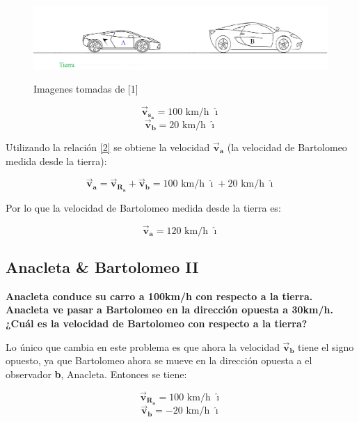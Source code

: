 \documentclass[a4paper,11pt]{article}
\begin{document}
	
	\begin{figure}[h]
		\includegraphics[width=.9\linewidth]{./im/c2}
		\label{fcN4}
		\caption{Imagenes tomadas de [1]}
	\end{figure}
	
	
	$$ \vec{\textbf{v}}_{\textbf{s}_\textbf{a}} = 100 \text{ km/h } \boldsymbol{\hat{\imath}} $$
	$$ \vec{\textbf{v}}_{\textbf{b}} = 20 \text{ km/h } \boldsymbol{\hat{\imath}}$$ 
	
	
	Utilizando la relación \ref{2} se obtiene la velocidad $\vec{\textbf{v}}_{\textbf{a}}$ (la velocidad de Bartolomeo medida desde la tierra):
	
	\begin{equation}
	\vec{\textbf{v}}_{\textbf{a}} = \vec{\textbf{v}}_{\textbf{R}_\textbf{a}} + \vec{\textbf{v}}_{\textbf{b}} = 100 \text{ km/h }\boldsymbol{\hat{\imath}} + 20 \text{ km/h } \boldsymbol{\hat{\imath}}
	\end{equation}
	
	Por lo que la velocidad de Bartolomeo medida desde la tierra es:
	
	\begin{equation}
	\vec{\textbf{v}}_{\textbf{a}}= 120 \text{ km/h } \boldsymbol{\hat{\imath}}
	\end{equation}
		\color{pb}
		\subsection{Anacleta \& Bartolomeo II}
	
	\textbf{Anacleta conduce su carro a 100km/h con respecto a la tierra. Anacleta ve pasar a Bartolomeo en la dirección opuesta a 30km/h. ¿Cuál es la velocidad de Bartolomeo con respecto a la tierra?\\}	\color{black}
	
	Lo único que cambia en este problema es que ahora la velocidad $\vec{\textbf{v}}_{\textbf{b}}$ tiene el signo opuesto, ya que Bartolomeo ahora se mueve en la dirección opuesta a el observador \textbf{b}, Anacleta. Entonces se tiene:
	
	
	$$ \vec{\textbf{v}}_{\textbf{R}_\textbf{a}} = 100 \text{ km/h } \boldsymbol{\hat{\imath}} $$
	$$ \vec{\textbf{v}}_{\textbf{b}} = -20 \text{ km/h } \boldsymbol{\hat{\imath}}$$ 
	
\end{document}
